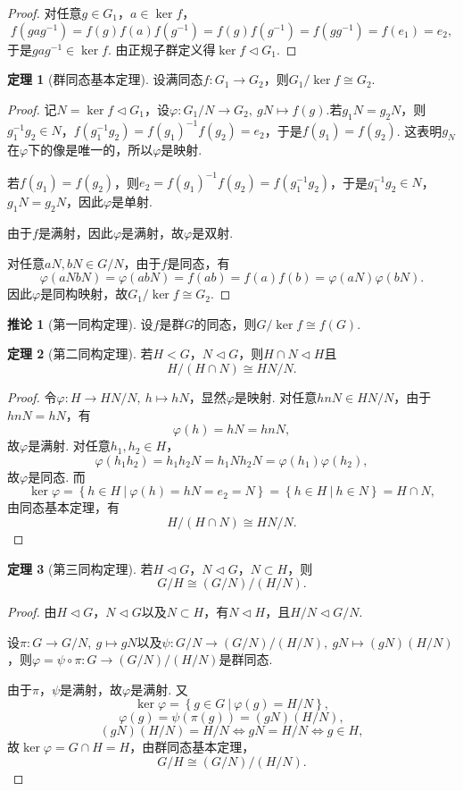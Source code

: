 \documentclass[12pt]{ctexart}
\theoremstyle{definition}
\newtheorem{theorem}{定理}
\newtheorem{corollary}{推论}
\theoremstyle{plain}
\begin{document}
	\begin{proof}
		对任意$g\in G_1$，$a\in\ker f$，
		$$f(gag^{-1})=f(g)f(a)f(g^{-1})=f(g)f(g^{-1})=f(gg^{-1})=f(e_1)=e_2,$$
		于是$gag^{-1}\in\ker f$. 由正规子群定义得$\ker f\lhd G_1$.
	\end{proof}
	\begin{theorem}[群同态基本定理]
		设满同态$f:G_1\to G_2$，则$G_1/\ker f\cong G_2$.
	\end{theorem}
	\begin{proof}
		记$N=\ker f\lhd G_1$，设$\varphi:G_1/N\to G_2,\ gN\mapsto f(g)$.若$g_1N=g_2N$，则$g_1^{-1}g_2\in N$，$f(g_1^{-1}g_2)=f(g_1)^{-1}f(g_2)=e_2$，于是$f(g_1)=f(g_2)$. 这表明$g_N$在$\varphi$下的像是唯一的，所以$\varphi$是映射.
		
		若$f(g_1)=f(g_2)$，则$e_2=f(g_1)^{-1}f(g_2)=f(g_1^{-1}g_2)$，于是$g_1^{-1}g_2\in N$，$g_1N=g_2N$，因此$\varphi$是单射.
		
		由于$f$是满射，因此$\varphi$是满射，故$\varphi$是双射.
		
		对任意$aN,bN\in G/N$，由于$f$是同态，有
		$$\varphi(aNbN)=\varphi(abN)=f(ab)=f(a)f(b)=\varphi(aN)\varphi(bN).$$
		因此$\varphi$是同构映射，故$G_1/\ker f\cong G_2$.
	\end{proof}
	\begin{corollary}[第一同构定理]
		设$f$是群$G$的同态，则$G/\ker f\cong f(G)$.
	\end{corollary}
	\begin{theorem}[第二同构定理]
		若$H<G$，$N\lhd G$，则$H\cap N\lhd H$且
		$$H/(H\cap N)\cong HN/N.$$
	\end{theorem}
	\begin{proof}
		令$\varphi:H\to HN/N,\ h\mapsto hN$，显然$\varphi$是映射. 对任意$hnN\in HN/N$，由于$hnN=hN$，有$$\varphi(h)=hN=hnN,$$故$\varphi$是满射. 对任意$h_1,h_2\in H$，
		$$\varphi(h_1h_2)=h_1h_2N=h_1Nh_2N=\varphi(h_1)\varphi(h_2),$$
		故$\varphi$是同态. 而
		$$\ker\varphi=\left\{h\in H\ |\ \varphi(h)=hN=e_2=N\right\}=\left\{h\in H\ |\ h\in N\right\}=H\cap N,$$
		由同态基本定理，有
		$$H/(H\cap N)\cong HN/N.$$
	\end{proof}
	\begin{theorem}[第三同构定理]
		若$H\lhd G$，$N\lhd G$，$N\subset H$，则
		$$G/H\cong (G/N)/(H/N).$$
	\end{theorem}
	\begin{proof}
		由$H\lhd G$，$N\lhd G$以及$N\subset H$，有$N\lhd H$，且$H/N\lhd G/N$.
		
		设$\pi:G\to G/N,\ g\mapsto gN$以及$\psi:G/N\to(G/N)/(H/N),\ gN\mapsto (gN)(H/N)$，则$\varphi=\psi\circ\pi:G\to(G/N)/(H/N)$是群同态.
		
		由于$\pi$，$\psi$是满射，故$\varphi$是满射. 又
		$$\ker\varphi=\left\{g\in G\ |\ \varphi(g)=H/N\right\},$$
		$$\varphi(g)=\psi(\pi(g))=(gN)(H/N),$$
		$$(gN)(H/N)=H/N\iff gN=H/N\iff g\in H,$$
		故$\ker\varphi=G\cap H=H$，由群同态基本定理，
		$$G/H\cong (G/N)/(H/N).$$
	\end{proof}
\end{document}
